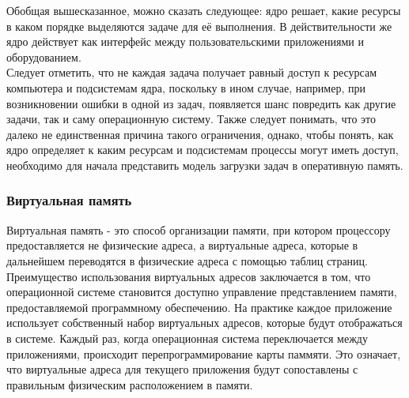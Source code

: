 \indent Обобщая вышесказанное, можно сказать следующее: 
ядро решает, какие ресурсы в каком порядке выделяются задаче для её выполнения.
В действительности же ядро действует как интерфейс между пользовательскими приложениями и оборудованием.\\
Следует отметить, что не каждая задача получает равный доступ к ресурсам компьютера и подсистемам ядра,
поскольку в ином случае, например, при возникновении ошибки в одной из задач,
появляется шанс повредить как другие задачи, так и саму операционную систему.
Также следует понимать, что это далеко не единственная причина такого ограничения, однако,
чтобы понять, как ядро определяет к каким ресурсам и подсистемам процессы могут иметь доступ,
необходимо для начала представить модель загрузки задач в оперативную память.

\subsubsection{Виртуальная память}\label{subsec:-}

Виртуальная память - это способ организации памяти, при котором процессору предоставляется не физические адреса, а виртуальные адреса, которые в дальнейшем переводятся в физические адреса с помощью таблиц страниц.
\\
Преимущество использования виртуальных адресов заключается в том,
что операционной системе становится доступно управление представлением памяти,
предоставляемой программному обеспечению.
На практике каждое приложение использует собственный набор виртуальных адресов,
которые будут отображаться в системе.
Каждый раз, когда операционная система переключается между приложениями, происходит перепрограммирование карты паммяти.
Это означает, что виртуальные адреса для текущего приложения будут сопоставлены с правильным физическим расположением в памяти\cite{arm-virt}.\\

